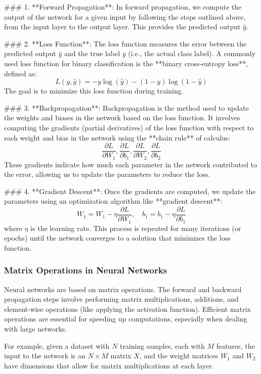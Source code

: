 \documentclass{article}
\begin{document}
### 1. **Forward Propagation**:
   In forward propagation, we compute the output of the network for a given input by following the steps outlined above, from the input layer to the output layer. This provides the predicted output \( \hat{y} \).

### 2. **Loss Function**:
   The loss function measures the error between the predicted output \( \hat{y} \) and the true label \( y \) (i.e., the actual class label). A commonly used loss function for binary classification is the **binary cross-entropy loss**, defined as:
   \[
   L(y, \hat{y}) = -y \log(\hat{y}) - (1 - y) \log(1 - \hat{y})
   \]
   The goal is to minimize this loss function during training.

### 3. **Backpropagation**:
   Backpropagation is the method used to update the weights and biases in the network based on the loss function. It involves computing the gradients (partial derivatives) of the loss function with respect to each weight and bias in the network using the **chain rule** of calculus:
   \[
   \frac{\partial L}{\partial W_1}, \frac{\partial L}{\partial b_1}, \frac{\partial L}{\partial W_2}, \frac{\partial L}{\partial b_2}
   \]
   These gradients indicate how much each parameter in the network contributed to the error, allowing us to update the parameters to reduce the loss.

### 4. **Gradient Descent**:
   Once the gradients are computed, we update the parameters using an optimization algorithm like **gradient descent**:
   \[
   W_1 = W_1 - \eta \frac{\partial L}{\partial W_1}, \quad b_1 = b_1 - \eta \frac{\partial L}{\partial b_1}
   \]
   where \( \eta \) is the learning rate. This process is repeated for many iterations (or epochs) until the network converges to a solution that minimizes the loss function.

\subsubsection*{Matrix Operations in Neural Networks}

Neural networks are based on matrix operations. The forward and backward propagation steps involve performing matrix multiplications, additions, and element-wise operations (like applying the activation function). Efficient matrix operations are essential for speeding up computations, especially when dealing with large networks.

For example, given a dataset with \( N \) training samples, each with \( M \) features, the input to the network is an \( N \times M \) matrix \( X \), and the weight matrices \( W_1 \) and \( W_2 \) have dimensions that allow for matrix multiplications at each layer.
\end{document}

